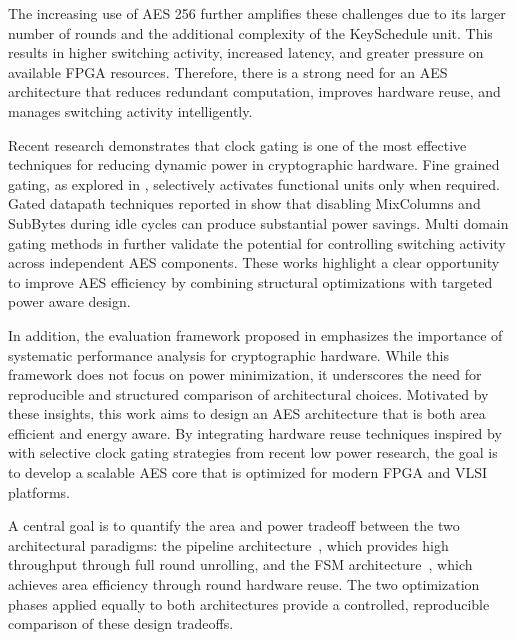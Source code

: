 The increasing use of AES 256 further amplifies these challenges due to its larger number of rounds and the additional complexity of the KeySchedule unit. This results in higher switching activity, increased latency, and greater pressure on available FPGA resources. Therefore, there is a strong need for an AES architecture that reduces redundant computation, improves hardware reuse, and manages switching activity intelligently.

Recent research demonstrates that clock gating is one of the most effective techniques for reducing dynamic power in cryptographic hardware. Fine grained gating, as explored in \cite{selvapriya2023lowpower}, selectively activates functional units only when required. Gated datapath techniques reported in \cite{darwish2022configurable} show that disabling MixColumns and SubBytes during idle cycles can produce substantial power savings. Multi domain gating methods in \cite{lee2021multidomain} further validate the potential for controlling switching activity across independent AES components. These works highlight a clear opportunity to improve AES efficiency by combining structural optimizations with targeted power aware design.

In addition, the evaluation framework proposed in \cite{guruprasad2018evaluation} emphasizes the importance of systematic performance analysis for cryptographic hardware. While this framework does not focus on power minimization, it underscores the need for reproducible and structured comparison of architectural choices. Motivated by these insights, this work aims to design an AES architecture that is both area efficient and energy aware. By integrating hardware reuse techniques inspired by \cite{gunasekaran_aes256_virtex7} with selective clock gating strategies from recent low power research, the goal is to develop a scalable AES core that is optimized for modern FPGA and VLSI platforms.

A central goal is to quantify the area and power tradeoff between the two architectural
paradigms: the pipeline architecture~\cite{good_pipelined_aes_2005}, which provides high
throughput through full round unrolling, and the FSM
architecture~\cite{mcloone_fsm_aes_2003}, which achieves area efficiency through round
hardware reuse. The two optimization phases applied equally to both architectures provide a
controlled, reproducible comparison of these design tradeoffs.

